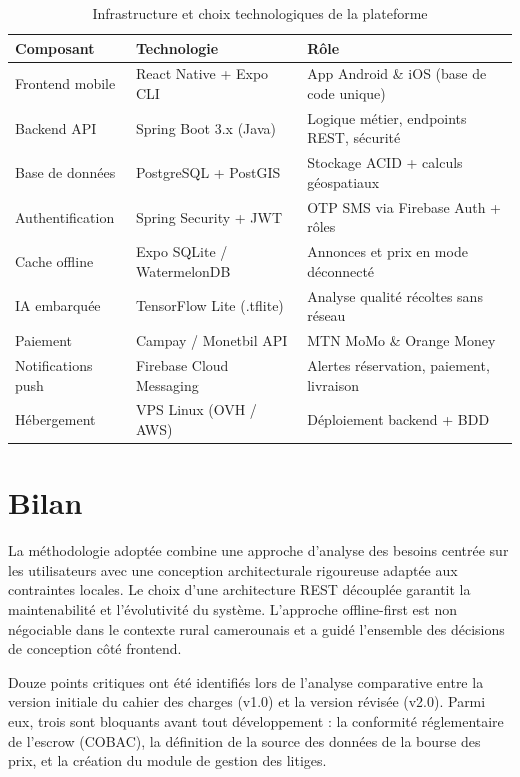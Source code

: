 \documentclass[12pt,a4paper]{report}
\begin{document}
\begin{table}[H]
\centering
\caption{Infrastructure et choix technologiques de la plateforme}
\begin{tabularx}{\textwidth}{L{3.5cm} L{5cm} X}
\toprule
\textbf{Composant} & \textbf{Technologie} & \textbf{Rôle} \\
\midrule
Frontend mobile & React Native + Expo CLI & App Android \& iOS (base de code unique) \\
Backend API & Spring Boot 3.x (Java) & Logique métier, endpoints REST, sécurité \\
Base de données & PostgreSQL + PostGIS & Stockage ACID + calculs géospatiaux \\
Authentification & Spring Security + JWT & OTP SMS via Firebase Auth + rôles \\
Cache offline & Expo SQLite / WatermelonDB & Annonces et prix en mode déconnecté \\
IA embarquée & TensorFlow Lite (.tflite) & Analyse qualité récoltes sans réseau \\
Paiement & Campay / Monetbil API & MTN MoMo \& Orange Money \\
Notifications push & Firebase Cloud Messaging & Alertes réservation, paiement, livraison \\
Hébergement & VPS Linux (OVH / AWS) & Déploiement backend + BDD \\
\bottomrule
\end{tabularx}
\end{table}

\section{Bilan}

La méthodologie adoptée combine une approche d'analyse des besoins centrée sur les utilisateurs avec une conception architecturale rigoureuse adaptée aux contraintes locales. Le choix d'une architecture REST découplée garantit la maintenabilité et l'évolutivité du système. L'approche offline-first est non négociable dans le contexte rural camerounais et a guidé l'ensemble des décisions de conception côté frontend.

Douze points critiques ont été identifiés lors de l'analyse comparative entre la version initiale du cahier des charges (v1.0) et la version révisée (v2.0). Parmi eux, trois sont bloquants avant tout développement : la conformité réglementaire de l'escrow (COBAC), la définition de la source des données de la bourse des prix, et la création du module de gestion des litiges.
\end{document}
